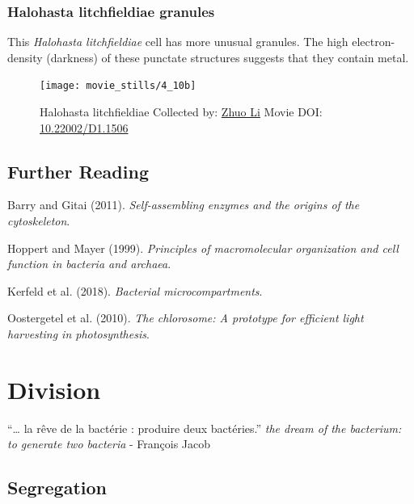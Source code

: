 \documentclass[]{tufte-book}
\begin{document}
\hypertarget{Halohasta_litchfieldiae_granules}{\subsection{Halohasta
litchfieldiae granules}\label{Halohasta_litchfieldiae_granules}}

This \emph{Halohasta litchfieldiae} cell has more unusual granules. The
high electron-density (darkness) of these punctate structures suggests
that they contain metal.





\begin{figure}
\texttt{[image: movie\_stills/4\_10b]} \caption[Halohasta litchfieldiae Collected by:
\protect\hyperlink{zhuo_li}{Zhuo Li} Movie DOI:
\href{https://doi.org/10.22002/D1.1506}{10.22002/D1.1506}]{Halohasta litchfieldiae Collected by:
\protect\hyperlink{zhuo_li}{Zhuo Li} Movie DOI:
\href{https://doi.org/10.22002/D1.1506}{10.22002/D1.1506}}\label{fig:4-10b}
\end{figure}

\section{Further Reading}\label{further-reading}

Barry and Gitai (2011). \emph{Self-assembling enzymes and the origins of
the cytoskeleton}.\citep{barry2011}

Hoppert and Mayer (1999). \emph{Principles of macromolecular
organization and cell function in bacteria and
archaea}.\citep{hoppert1999}

Kerfeld et al. (2018). \emph{Bacterial
microcompartments}.\citep{kerfeld2018}

Oostergetel et al. (2010). \emph{The chlorosome: A prototype for
efficient light harvesting in photosynthesis}.\citep{oostergetel2010}

\chapter{Division}\label{division}

``\ldots{} la rêve de la bactérie : produire deux bactéries.'' \emph{the
dream of the bacterium: to generate two bacteria} - François Jacob
\citep{jacob2002a}

\section{Segregation}\label{segregation}
\end{document}
